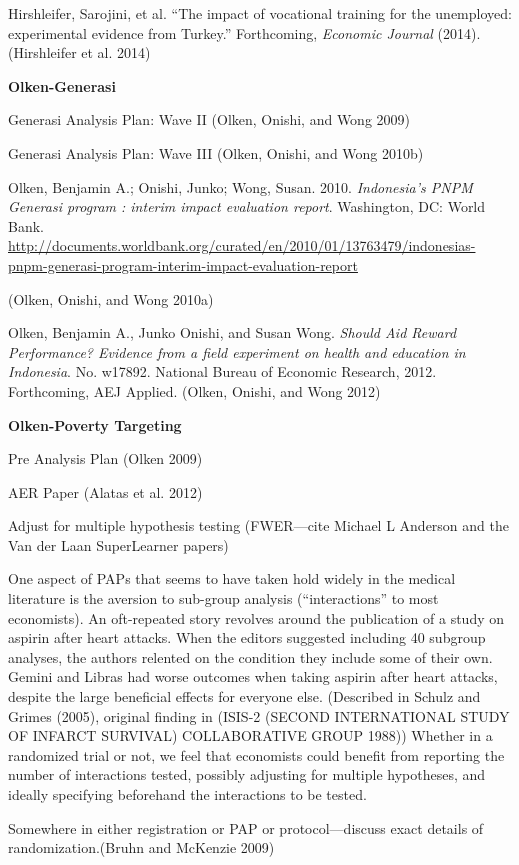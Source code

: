 \documentclass[12pt] {article}
\begin{document}
Hirshleifer, Sarojini, et al. ``The impact of vocational training for
the unemployed: experimental evidence from Turkey.'' Forthcoming,
\emph{Economic Journal} (2014).(Hirshleifer et al. 2014)

\textbf{Olken-Generasi}

Generasi Analysis Plan: Wave II (Olken, Onishi, and Wong 2009)

Generasi Analysis Plan: Wave III (Olken, Onishi, and Wong 2010b)

Olken, Benjamin A.; Onishi, Junko; Wong, Susan. 2010. \emph{Indonesia's
PNPM Generasi program : interim impact evaluation report}. Washington,
DC: World Bank.
\url{http://documents.worldbank.org/curated/en/2010/01/13763479/indonesias-pnpm-generasi-program-interim-impact-evaluation-report}

(Olken, Onishi, and Wong 2010a)

Olken, Benjamin A., Junko Onishi, and Susan Wong. \emph{Should Aid
Reward Performance? Evidence from a field experiment on health and
education in Indonesia}. No. w17892. National Bureau of Economic
Research, 2012. Forthcoming, AEJ Applied. (Olken, Onishi, and Wong 2012)

\textbf{Olken-Poverty Targeting}

Pre Analysis Plan (Olken 2009)

AER Paper (Alatas et al. 2012)

Adjust for multiple hypothesis testing (FWER---cite Michael L Anderson
and the Van der Laan SuperLearner papers)

One aspect of PAPs that seems to have taken hold widely in the medical
literature is the aversion to sub-group analysis (``interactions'' to
most economists). An oft-repeated story revolves around the publication
of a study on aspirin after heart attacks. When the editors suggested
including 40 subgroup analyses, the authors relented on the condition
they include some of their own. Gemini and Libras had worse outcomes
when taking aspirin after heart attacks, despite the large beneficial
effects for everyone else. (Described in Schulz and Grimes (2005),
original finding in (ISIS-2 (SECOND INTERNATIONAL STUDY OF INFARCT
SURVIVAL) COLLABORATIVE GROUP 1988)) Whether in a randomized trial or
not, we feel that economists could benefit from reporting the number of
interactions tested, possibly adjusting for multiple hypotheses, and
ideally specifying beforehand the interactions to be tested.

Somewhere in either registration or PAP or protocol---discuss exact
details of randomization.(Bruhn and McKenzie 2009)
\end{document}

